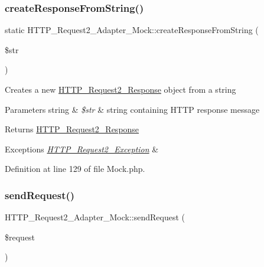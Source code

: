 \subsubsection{\texorpdfstring{create\+Response\+From\+String()}{createResponseFromString()}}
{\footnotesize\ttfamily static H\+T\+T\+P\+\_\+\+Request2\+\_\+\+Adapter\+\_\+\+Mock\+::create\+Response\+From\+String (\begin{DoxyParamCaption}\item[{}]{\$str }\end{DoxyParamCaption})\hspace{0.3cm}{\ttfamily [static]}}

Creates a new \hyperlink{classHTTP__Request2__Response}{H\+T\+T\+P\+\_\+\+Request2\+\_\+\+Response} object from a string


\begin{DoxyParams}[1]{Parameters}
string & {\em \$str} & string containing H\+T\+TP response message\\
\hline
\end{DoxyParams}
\begin{DoxyReturn}{Returns}
\hyperlink{classHTTP__Request2__Response}{H\+T\+T\+P\+\_\+\+Request2\+\_\+\+Response} 
\end{DoxyReturn}

\begin{DoxyExceptions}{Exceptions}
{\em \hyperlink{classHTTP__Request2__Exception}{H\+T\+T\+P\+\_\+\+Request2\+\_\+\+Exception}} & \\
\hline
\end{DoxyExceptions}


Definition at line 129 of file Mock.\+php.

\mbox{\label{classHTTP__Request2__Adapter__Mock_ab85697c5438cc9b4c834ac6f15c46247}} 
\subsubsection{\texorpdfstring{send\+Request()}{sendRequest()}}
{\footnotesize\ttfamily H\+T\+T\+P\+\_\+\+Request2\+\_\+\+Adapter\+\_\+\+Mock\+::send\+Request (\begin{DoxyParamCaption}\item[{\hyperlink{classHTTP__Request2}{H\+T\+T\+P\+\_\+\+Request2}}]{\$request }\end{DoxyParamCaption})}

